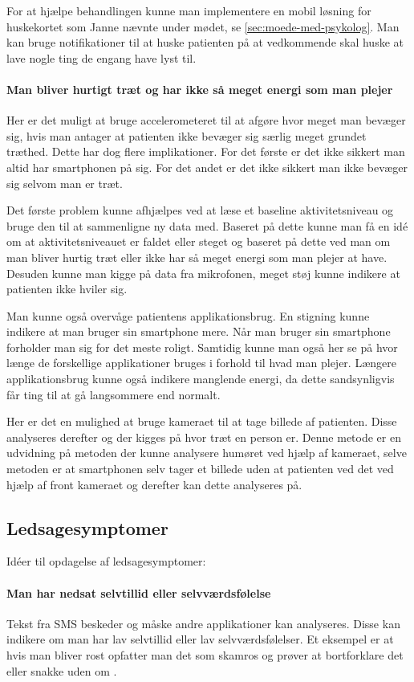 For at hjælpe behandlingen kunne man implementere en mobil løsning for huskekortet som Janne nævnte under mødet, se \cref{sec:moede-med-psykolog}. Man kan bruge notifikationer til at huske patienten på at vedkommende skal huske at lave nogle ting de engang have lyst til.

\paragraph{Man bliver hurtigt træt og har ikke så meget energi som man plejer}
Her er det muligt at bruge accelerometeret til at afgøre hvor meget man bevæger sig, hvis man antager at patienten ikke bevæger sig særlig meget grundet træthed. Dette har dog flere implikationer. For det første er det ikke sikkert man altid har smartphonen på sig. For det andet er det ikke sikkert man ikke bevæger sig selvom man er træt.

Det første problem kunne afhjælpes ved at læse et baseline aktivitetsniveau og bruge den til at sammenligne ny data med. Baseret på dette kunne man få en idé om at aktivitetsniveauet er faldet eller steget og baseret på dette ved man om man bliver hurtig træt eller ikke har så meget energi som man plejer at have. 
Desuden kunne man kigge på data fra mikrofonen, meget støj kunne indikere at patienten ikke hviler sig.

Man kunne også overvåge patientens applikationsbrug. 
En stigning kunne indikere at man bruger sin smartphone mere. 
Når man bruger sin smartphone forholder man sig for det meste roligt.
Samtidig kunne man også her se på hvor længe de forskellige applikationer bruges i forhold til hvad man plejer.
Længere applikationsbrug kunne også indikere manglende energi, da dette sandsynligvis får ting til at gå langsommere end normalt.

Her er det en mulighed at bruge kameraet til at tage billede af patienten. Disse analyseres derefter og der kigges på hvor træt en person er. 
Denne metode er en udvidning på metoden der kunne analysere humøret ved hjælp af kameraet, selve metoden er at smartphonen selv tager et billede uden at patienten ved det ved hjælp af front kameraet og derefter kan dette analyseres på.

\subsection{Ledsagesymptomer}\label{depr_ledsage}
Idéer til opdagelse af ledsagesymptomer:
\paragraph{Man har nedsat selvtillid eller selvværdsfølelse}
Tekst fra SMS beskeder og måske andre applikationer kan analyseres. Disse kan indikere om man har lav selvtillid eller lav selvværdsfølelser. Et eksempel er at hvis man bliver rost opfatter man det som skamros og prøver at bortforklare det eller snakke uden om \citep{selvtillid}.

